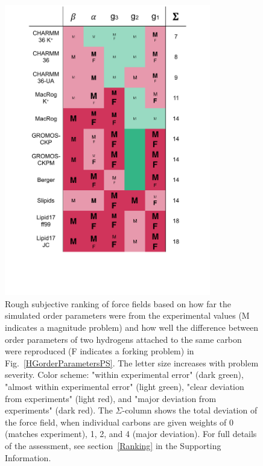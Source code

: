 \documentclass[journal=jpcbfk,manuscript=article]{achemso}
\begin{document}
\begin{figure}[]
  \centering
  \includegraphics[width=9.0cm]{../Figs/comparisonTablePS.pdf}
  \caption{\label{comparisonTablePS}
    Rough subjective ranking of force fields based on how far the simulated order parameters were from the experimental
    values ({\textsf{\small M}} indicates a magnitude problem) and how well the difference between order parameters
    of two hydrogens attached to the same carbon were reproduced ({\textsf{\small F}} indicates a forking problem)
    in Fig.~\ref{HGorderParametersPS}.
    The letter size increases with problem severity. Color scheme: "within experimental error" (dark green), "almost within experimental error" (light green), "clear deviation from experiments" (light red), and "major deviation from experiments" (dark red). The $\Sigma$-column shows the total deviation of the force field, when individual carbons are given weights of 0 (matches experiment), 1, 2, and 4 (major deviation). For full details of the assessment, see section~\ref{Ranking} in the Supporting Information.
  }
\end{figure}
\end{document}
